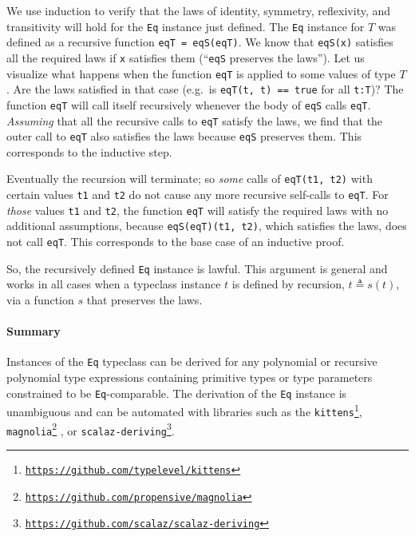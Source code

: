 We use induction to verify that the laws of identity, symmetry, reflexivity,
and transitivity will hold for the \lstinline!Eq! instance just defined.
The \lstinline!Eq! instance for $T$ was defined as a recursive function
\lstinline!eqT = eqS(eqT)!. We know that \lstinline!eqS(x)! satisfies
all the required laws if \lstinline!x! satisfies them (``\lstinline!eqS!
preserves the laws''). Let us visualize what happens when the function
\lstinline!eqT! is applied to some values of type $T$. Are the laws
satisfied in that case (e.g.~is \lstinline!eqT(t, t) == true! for
all \lstinline!t:T!)? The function \lstinline!eqT! will call itself
recursively whenever the body of \lstinline!eqS! calls \lstinline!eqT!.
\emph{Assuming} that all the recursive calls to \lstinline!eqT! satisfy
the laws, we find that the outer call to \lstinline!eqT! also satisfies
the laws because \lstinline!eqS! preserves them. This corresponds
to the inductive step.

Eventually the recursion will terminate; so \emph{some} calls of \lstinline!eqT(t1, t2)!
with certain values \lstinline!t1! and \lstinline!t2! do not cause
any more recursive self-calls to \lstinline!eqT!. For \emph{those}
values \lstinline!t1! and \lstinline!t2!, the function \lstinline!eqT!
will satisfy the required laws with no additional assumptions, because
\lstinline!eqS(eqT)(t1, t2)!, which satisfies the laws, does not
call \lstinline!eqT!. This corresponds to the base case of an inductive
proof. 

So, the recursively defined \lstinline!Eq! instance is lawful. This
argument is general and works in all cases when a typeclass instance
$t$ is defined by recursion, $t\triangleq s(t)$, via a function
$s$ that preserves the laws.

\paragraph{Summary}

Instances of the \lstinline!Eq! typeclass can be derived for any
polynomial or recursive polynomial type expressions containing primitive
types or type parameters constrained to be \lstinline!Eq!-comparable.
The derivation of the \lstinline!Eq! instance is unambiguous and
can be automated with libraries such as the \texttt{kittens}\footnote{\texttt{\href{https://github.com/typelevel/kittens}{https://github.com/typelevel/kittens}}},
\texttt{magnolia}\footnote{\texttt{\href{https://github.com/propensive/magnolia}{https://github.com/propensive/magnolia}}}
, or \texttt{scalaz-deriving}\footnote{\texttt{\href{https://github.com/scalaz/scalaz-deriving}{https://github.com/scalaz/scalaz-deriving}}}.

